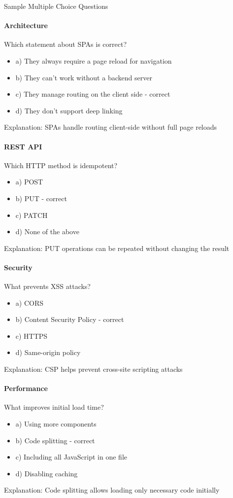 \begin{KR}{Sample Multiple Choice Questions}

\paragraph{Architecture}
Which statement about SPAs is correct?
\begin{itemize}
    \item a) They always require a page reload for navigation
    \item b) They can't work without a backend server
    \item c) They manage routing on the client side - correct
    \item d) They don't support deep linking
\end{itemize}
Explanation: SPAs handle routing client-side without full page reloads

\paragraph{REST API}
Which HTTP method is idempotent?
\begin{itemize}
    \item a) POST
    \item b) PUT - correct
    \item c) PATCH
    \item d) None of the above
\end{itemize}
Explanation: PUT operations can be repeated without changing the result

\paragraph{Security}
What prevents XSS attacks?
\begin{itemize}
    \item a) CORS
    \item b) Content Security Policy - correct
    \item c) HTTPS
    \item d) Same-origin policy
\end{itemize}
Explanation: CSP helps prevent cross-site scripting attacks

\paragraph{Performance}
What improves initial load time?
\begin{itemize}
    \item a) Using more components
    \item b) Code splitting - correct
    \item c) Including all JavaScript in one file
    \item d) Disabling caching
\end{itemize}
Explanation: Code splitting allows loading only necessary code initially


\end{KR}
